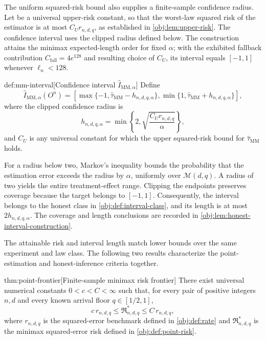 The uniform squared-risk bound also supplies a finite-sample confidence radius. Let  be a universal upper-risk constant, so that the worst-law squared risk of the estimator is at most \(C_Ur_{n,d,q}\), as established in \cref{obj:lem:upper-risk}. The confidence interval  uses the clipped radius  defined below. The construction attains the minimax expected-length order for fixed \(\alpha\); with the exhibited fallback contribution \(C_{\mathrm{fall}}=4e^{128}\) and resulting choice of \(C_U\), its interval equals \([-1,1]\) whenever \(\ell_n<128\).

\begin{definitionv}{def:mm-interval}[Confidence interval $\widehat I_{\mathrm{MM},\alpha}$]
Define
\[
\widehat I_{\mathrm{MM},\alpha}(O^n)
=
\left[
\max\{-1,\widehat\tau_{\mathrm{MM}}-h_{n,d,q,\alpha}\},
\min\{1,\widehat\tau_{\mathrm{MM}}+h_{n,d,q,\alpha}\}
\right],
\]
where the clipped confidence radius is
\[
h_{n,d,q,\alpha}
=\min\left\{2,\sqrt{\frac{C_Ur_{n,d,q}}{\alpha}}\right\},
\]
and \(C_U\) is any universal constant for which the upper squared-risk bound for \(\widehat\tau_{\mathrm{MM}}\) holds.
\end{definitionv}

For a radius below two, Markov's inequality bounds the probability that the estimation error exceeds the radius by \(\alpha\), uniformly over \(\mathcal M(d,q)\). A radius of two yields the entire treatment-effect range. Clipping the endpoints preserves coverage because the target belongs to \([-1,1]\). Consequently, the interval belongs to the honest class in \cref{obj:def:interval-class}, and its length is at most \(2h_{n,d,q,\alpha}\). The coverage and length conclusions are recorded in \cref{obj:lem:honest-interval-construction}.

The attainable risk and interval length match lower bounds over the same experiment and law class. The following two results characterize the point-estimation and honest-inference criteria together.

\begin{theoremv}{thm:point-frontier}[Finite-sample minimax risk frontier]
There exist universal numerical constants \(0<c<C<\infty\) such that, for every pair of positive integers \(n,d\) and every known arrival floor \(q\in[1/2,1]\),
\[
c\,r_{n,d,q}\le \mathfrak R^*_{n,d,q}\le C\,r_{n,d,q},
\]
where \(r_{n,d,q}\) is the squared-error benchmark defined in \cref{obj:def:rate} and \(\mathfrak R^*_{n,d,q}\) is the minimax squared-error risk defined in \cref{obj:def:point-risk}.
\end{theoremv}

